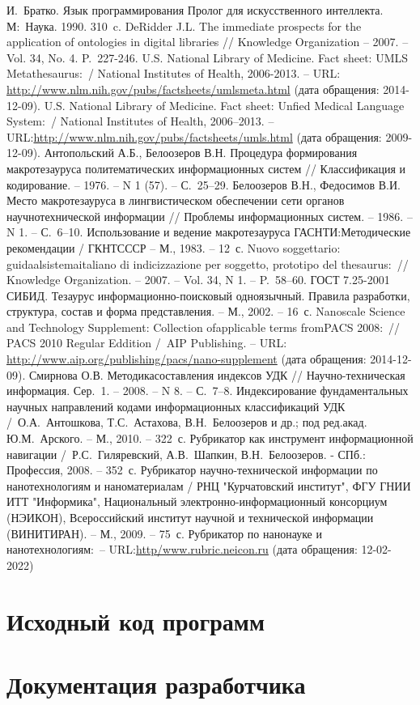 \documentclass{studrep}
\begin{document}
\begin{thebibliography}{99}
 И.~Братко. Язык программирования Пролог для искусственного интеллекта. М\;:~Наука. 1990. 310~c.
 DeRidder J.L. The immediate prospects for the application of ontologies in digital libraries // Knowledge Organization -- 2007. -- Vol. 34, No. 4. P.~227-246.
  U.S. National Library of Medicine. Fact sheet: UMLS Metathesaurus\;:\;[текст]~/ National Institutes of Health, 2006-2013. -- URL:
\url{http://www.nlm.nih.gov/pubs/factsheets/umlsmeta.html} (дата обращения: 2014-12-09).
  U.S. National Library of Medicine. Fact sheet: Unfied Medical Language System\;:\;[текст]~/ National Institutes of Health, 2006--2013. -- URL:\url{http://www.nlm.nih.gov/pubs/factsheets/umls.html} (дата обращения: 2009-12-09).
  Антопольский А.Б., Белоозеров В.Н. Процедура формирования макротезауруса политематических информационных систем // Классификация и кодирование. -- 1976. -- N 1 (57). -- С.~25--29.
  Белоозеров В.Н., Федосимов В.И. Место макротезауруса в лингвистическом обеспечении сети органов научнотехнической информации // Проблемы информационных систем. -- 1986. -- N 1. -- С.~6--10.
  Использование и ведение макротезауруса ГАСНТИ:Методические рекомендации / ГКНТСССР -- М., 1983. -- 12~с.
  Nuovo soggettario: guidaalsistemaitaliano di indicizzazione per soggetto, prototipo del thesaurus\;:\;[рецензия]~// Knowledge Organization. -- 2007. -- Vol. 34, N 1. -- P.~58--60.
  ГОСТ 7.25-2001 СИБИД. Тезаурус информационно-поисковый одноязычный. Правила разработки, структура, состав и форма представления. -- М., 2002. -- 16~с.
  Nanoscale Science and Technology Supplement: Collection ofapplicable terms fromPACS 2008\;:\;[текст]~// PACS 2010 Regular Eddition /~AIP Publishing. -- URL: \url{http://www.aip.org/publishing/pacs/nano-supplement} (дата обращения: 2014-12-09).
  Смирнова О.В. Методикасоставления индексов УДК // Научно-техническая информация. Сер.~1. -- 2008. -- N 8. -- С.~7--8.
  Индексирование фундаментальных научных направлений кодами информационных классификаций УДК /~О.А.~Антошкова, Т.С.~Астахова, В.Н.~Белоозеров и др.; под ред.акад. Ю.М.~Арского. -- М., 2010. -- 322~с.
  Рубрикатор как инструмент информационной навигации /~Р.С.~Гиляревский, А.В.~Шапкин, В.Н.~Белоозеров. - СПб.\;: Профессия, 2008. -- 352~с.
  Рубрикатор научно-технической информации по нанотехнологиям и наноматериалам / РНЦ "Курчатовский институт",
ФГУ ГНИИ ИТТ "Информика", Национальный электронно-информационный консорциум (НЭИКОН), Всероссийский институт научной и технической информации (ВИНИТИРАН). -- М., 2009. -- 75~с.
  Рубрикатор по нанонауке и нанотехнологиям\;:\;[сайт]~-- URL:\url{http/www.rubric.neicon.ru} (дата обращения: 12-02-2022)
\end{thebibliography}

\appendices

\chapter{Исходный код программ}
\chapter{Документация разработчика}
\end{document}
